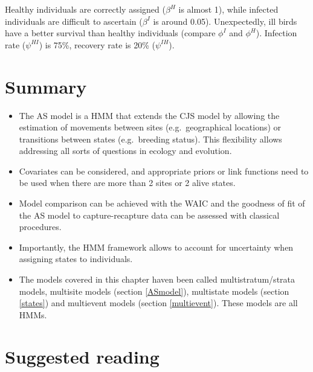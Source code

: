 \documentclass[
  12pt,
]{krantz}
\begin{document}
Healthy individuals are correctly assigned (\(\beta^H\) is almost 1), while infected individuals are difficult to ascertain (\(\beta^I\) is around 0.05). Unexpectedly, ill birds have a better survival than healthy individuals (compare \(\phi^I\) and \(\phi^H\)). Infection rate (\(\psi^{HI}\)) is 75\%, recovery rate is 20\% (\(\psi^{IH}\)).

\section{Summary}\label{summary-4}

\begin{itemize}
\item
  The AS model is a HMM that extends the CJS model by allowing the estimation of movements between sites (e.g.~geographical locations) or transitions between states (e.g.~breeding status). This flexibility allows addressing all sorts of questions in ecology and evolution.
\item
  Covariates can be considered, and appropriate priors or link functions need to be used when there are more than 2 sites or 2 alive states.
\item
  Model comparison can be achieved with the WAIC and the goodness of fit of the AS model to capture-recapture data can be assessed with classical procedures.
\item
  Importantly, the HMM framework allows to account for uncertainty when assigning states to individuals.
\item
  The models covered in this chapter haven been called multistratum/strata models, multisite models (section \ref{ASmodel}), multistate models (section \ref{states}) and multievent models (section \ref{multievent}). These models are all HMMs.
\end{itemize}

\section{Suggested reading}\label{suggested-reading-4}
\end{document}
